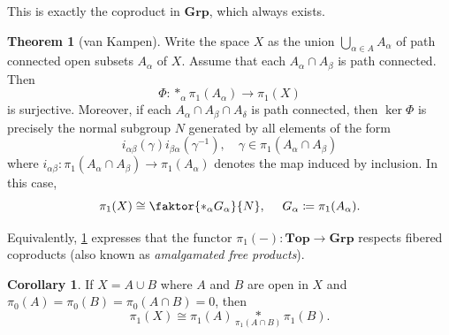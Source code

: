 \documentclass[10pt,letterpaper,cm]{nupset}
\theoremstyle{definition}
\theoremstyle{theorem}
\newtheorem{theorem}[definition]{Theorem}
\newtheorem{corollary}[definition]{Corollary}
\theoremstyle{remark}
\newcommand{\1}{\mathbb{1}}
\newcommand{\0}{\vec 0}
\begin{document}
\smallskip

This is exactly the coproduct in $\mathbf{Grp}$, which always exists.


\begin{theorem}[van Kampen]\label{vKamp}
Write the space $X$ as the union $\bigcup_{\alpha \in A} A_{\alpha}$ of path connected open subsets $A_{\alpha}$ of $X$. Assume that each $A_{\alpha} \cap A_{\beta}$ is path connected. Then $$\Phi : \ast_{\alpha} \pi_1(A_{\alpha}) \to \pi_1(X)$$ is surjective. Moreover, if each $A_{\alpha} \cap A_{\beta} \cap A_{\delta}$ is path connected, then $\ker{\Phi}$ is precisely the normal subgroup $N$ generated by all elements of the form $$ i_{\alpha \beta} (\gamma ) i_{\beta \alpha}(\gamma^{-1}), \quad \gamma \in \pi_1(A_{\alpha} \cap A_{\beta})$$ where $i_{\alpha \beta} : \pi_1(A_{\alpha} \cap A_{\beta}) \to \pi_1(A_{\alpha})$ denotes the map induced by inclusion.  In this case, $$\pi_1(X) \cong \faktor{\ast_{\alpha} G_{\alpha}}{N}, \ \quad G_{\alpha} \coloneqq  \pi_1(A_{\alpha}).$$
\end{theorem}


Equivalently, \cref{vKamp} expresses that the functor $\pi_1(-) : \mathbf{Top} \to \mathbf{Grp}$ respects fibered coproducts (also known as \textit{amalgamated free products}).

\smallskip

\begin{corollary}
If $X = A \cup B$ where $A$ and $B$ are open in $X$ and $\pi_0(A) = \pi_0(B) = \pi_0(A \cap B) = 0$, then $$\pi_1(X) \cong \pi_1(A) \underset{\pi_1(A\cap B)}{\ast} \pi_1(B).  $$
\end{corollary}
\end{document}
